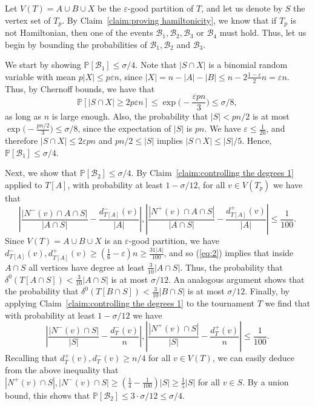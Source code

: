 \documentclass[a4paper,11pt]{article}
\makeatletter
\renewenvironment{proof}[1][\proofname] {\par\pushQED{\qed}\normalfont\topsep6\p@\@plus6\p@\relax\trivlist\item[\hskip\labelsep\textit{#1}\@addpunct{.}]\ignorespaces}{\popQED\endtrivlist\@endpefalse}
\theoremstyle{definition}
\def\eps{\varepsilon}
\def\Pb{\mathbb{P}}
\def\cB{\mathcal{B}}
\makeatother
\begin{document}
\begin{proof}[Proof of Lemma~\ref{lemma:using connectors}.]
Let $V(T)=A\cup B\cup X$ be the $\eps$-good partition of $T$, and let us denote by $S$ the vertex set of $T_p$. By Claim~\ref{claim:proving hamiltonicity}, we know that if $T_p$ is not Hamiltonian, then one of the events $\cB_1, \cB_2, \cB_3$ or $\cB_4$ must hold. Thus, let us begin by bounding the probabilities of $\cB_1, \cB_2$ and $\cB_3$.

We start by showing $\Pb[\cB_1]\leq \sigma/4$. Note that $|S\cap X|$ is a binomial random variable with mean $p|X|\leq p\eps n$, since $|X|= n-|A|-|B|\leq n-2\frac{1-\eps}{2}n=\eps n$. Thus, by Chernoff bounds, we have that 
\[\Pb[|S\cap X|\geq 2p\eps n]\leq \exp\Big(-\frac{\eps p n}{3}\Big)\leq \sigma/8,\]
as long as $n$ is large enough. Also, the probability that $|S|<pn/2$ is at most $\exp\Big(-\frac{p n/2}{3}\Big)\leq \sigma/8$, since the expectation of $|S|$ is $pn$. We have $\eps\leq \frac{1}{20}$, and therefore $|S\cap X|\leq 2\eps pn$ and $pn/2\leq |S|$ implies $|S\cap X|\leq |S|/5$. Hence, $\Pb[\cB_1]\leq \sigma/4$.

Next, we show that $\Pb[\cB_2]\leq \sigma/4$. By Claim~\ref{claim:controlling the degrees 1} applied to $T[A]$, with probability at least $1-\sigma/12$, for all $v\in V(T_p)$ we have that 
\begin{equation}\label{eq:2}
    \left|\frac{|N^-(v)\cap A\cap S|}{|A\cap S|}- \frac{d_{T[A]}^-(v)}{|A|}\right|,\left|\frac{|N^+(v)\cap A\cap S|}{|A\cap S|}- \frac{d_{T[A]}^+(v)}{|A|}\right|\leq \frac{1}{100}.
\end{equation}
Since $V(T)=A\cup B\cup X$ is an $\eps$-good partition, we have $d_{T[A]}^-(v), d_{T[A]}^+(v)\geq (\frac{1}{6}-\eps)n\geq \frac{31|A|}{100}$, and so (\ref{eq:2}) implies that inside $A\cap S$ all vertices have degree at least $\frac{3}{10}|A\cap S|$. Thus, the probability that $\delta^0(T[A\cap S])<\frac{3}{10}|A\cap S|$ is at most $\sigma/12$. An analogous argument shows that the probability that $\delta^0(T[B\cap S])<\frac{3}{10}|B\cap S|$ is at most $\sigma/12$. Finally, by applying Claim~\ref{claim:controlling the degrees 1} to the tournament $T$ we find that with probability at least $1-\sigma/12$ we have
\begin{equation*}
    \left|\frac{|N^-(v)\cap S|}{|S|}- \frac{d_{T}^-(v)}{n}\right|,\left|\frac{|N^+(v)\cap S|}{|S|}- \frac{d_{T}^+(v)}{n}\right|\leq \frac{1}{100}.
\end{equation*}
Recalling that $d^+_T(v), d^-_T(v)\geq n/4$ for all $v\in V(T)$, we can easily deduce from the above inequality that $|N^+(v)\cap S|, |N^-(v)\cap S|\geq (\frac{1}{4}-\frac{1}{100})|S|\geq \frac{1}{5}|S|$ for all $v\in S$. By a union bound, this shows that $\Pb[\cB_2]\leq 3\cdot \sigma/12\leq \sigma/4$.


\end{proof}
\end{document}

